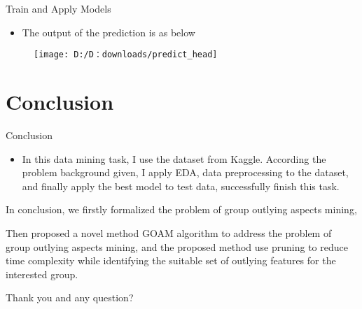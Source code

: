 \documentclass[
 size=14pt,
 paper=smartboard,  %
 mode=present, 		%
 display=slides, 	%
 style=tuliplab,  	%
 pauseslide,
 fleqn,leqno]{powerdot}
\begin{document}
\begin{slide}[toc=,bm=]{Train and Apply Models}
	\begin{itemize}
		\item
		The output of the prediction is as below
		
	\end{itemize}
	\vspace{.4cm}          
	\begin{minipage}{0.5\linewidth}
		\centering
	
\begin{figure}
	\centering
	\caption{}
	\label{fig:predicthead}
	\texttt{[image: D:/D：downloads/predict\_head]}
\end{figure}
		
	\end{minipage}
	
\end{slide}




\section{Conclusion}

\begin{slide}[toc=,bm=]{Conclusion}
\begin{itemize}
\item
 In this data mining task, I use the dataset from Kaggle. According the problem background given, I apply EDA, data preprocessing to the dataset, and finally apply the best model to test data, successfully finish this task.

\end{itemize}

\begin{note}
In conclusion,
we firstly formalized the problem of
group outlying aspects mining,

Then proposed a novel method GOAM algorithm to address the problem of
group outlying aspects mining,
and the proposed method use pruning to reduce time complexity
while identifying the suitable set of outlying features for the interested group.

Thank you and any question?
\end{note}

\end{slide}
\end{document}
